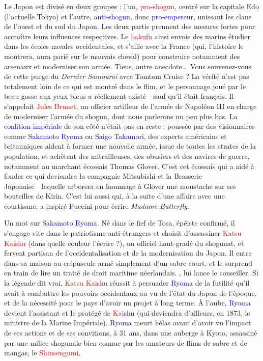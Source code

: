 Le Japon est divisé en deux groupes : l'un, \textcolor{red}{pro-shogun},
centré sur la capitale Edo (l'actuelle Tokyo) et l'autre, \textcolor{blue
}{anti-shogun}, donc \textcolor{blue}{pro-empereur}, unissant les clans de
l'ouest et du sud du Japon. Les deux partis prennent des mesures fortes pour
accroître leurs influences respectives. Le \textcolor{red}{bakufu} ainsi
envoie des marins étudier dans les écoles navales occidentales, et s'allie
avec la France (qui, l'histoire le montrera, aura parié sur le mauvais cheval)
pour construire notamment des arsenaux et moderniser son armée. Tiens, autre
anecdote\dots\ Vous souvenez-vous de cette purge du \emph{Dernier Samourai}
avec Tomtom Cruise ? La vérité n'est pas totalement loin de ce qui est montré
dans le flim, et le personnage joué par le beau gosse aux yeux bleus a
réellement existé~\incise~sauf qu'il était français. Il s'appelait
\textcolor{red}{Jules Brunet}, un officier artilleur de l'armée de Napoléon
III en charge de moderniser l'armée du shogun, dont nous parlerons un peu plus
bas. La \textcolor{blue}{coalition impériale} de son côté n'était pas en reste
: poussée par des visionnaires comme \textcolor{blue}{Sakamoto Ryoma} ou
\textcolor{blue}{Saigo Takamori}, des experts américains et britanniques
aident à former une nouvelle armée, issue de toutes les strates de la
population, et achètent des mitrailleuses, des obusiers et des navires de
guerre, notamment au marchant écossais Thomas Glover. C'est cet écossais qui a
aidé à fonder ce qui deviendra la compagnie Mitsubishi et la Brasserie
Japonaise~\incise~laquelle arborera en hommage à Glover une moustache sur ses
bouteilles de Kirin. C'est lui aussi qui, à la suite d'une affaire avec une
courtisane, a inspiré Puccini pour écrire \emph{Madame Butterfly}.

Un mot sur \textcolor{blue}{Sakamoto Ryoma}. Né dans le fief de Tosa, épéiste
confirmé, il s'engage vite dans le patriotisme anti-étrangers et choisit
d'assassiner \textcolor{red}{Katsu Kaishu} (dans quelle couleur l'écrire ?),
un officiel haut-gradé du shogunat, et fervent partisan de l'occidentalisation
et de la modernisation du Japon. Il entre dans sa maison au crépuscule armé
simplement d'un sabre court, et le surprend en train de lire un traité de
droit maritime néerlandais. , lui lance le conseiller. Si la légende dit
vrai, \textcolor{red}{Katsu Kaishu} réussit à persuader
\textcolor{blue}{Ryoma} de la futilité qu'il avait à combattre les pouvoirs
occidentaux au vu de l'état du Japon de l'époque, et de la nécessité pour le
pays d'avoir un projet à long terme. À l'aube, \textcolor{blue}{Ryoma} devient
l'assistant et le protégé de \textcolor{red}{Kai}\textcolor{blue}{shu} (qui
deviendra d'ailleurs, en 1873, le ministre de la Marine Impériale).
\textcolor{blue}{Ryoma} meurt hélas avant d'avoir vu l'impact de ses actions
et de ses convitions, à 31 ans, dans une auberge à Kyoto, assassiné par une
milice shogunale bien connue par les amateurs de flims de sabre et de mangas,
le \textcolor{red}{Shinsengumi}.

